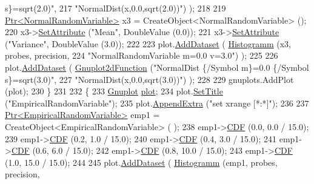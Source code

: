 \begin{DoxyCode}
{       s\}=sqrt(2.0)"},
217                                          \textcolor{stringliteral}{"NormalDist(x,0.0,sqrt(2.0))"}) );
218 
219     \hyperlink{classns3_1_1Ptr}{Ptr<NormalRandomVariable>} x3 = CreateObject<NormalRandomVariable> ();
220     x3->\hyperlink{classns3_1_1ObjectBase_ac60245d3ea4123bbc9b1d391f1f6592f}{SetAttribute} (\textcolor{stringliteral}{"Mean"}, DoubleValue (0.0));
221     x3->\hyperlink{classns3_1_1ObjectBase_ac60245d3ea4123bbc9b1d391f1f6592f}{SetAttribute} (\textcolor{stringliteral}{"Variance"}, DoubleValue (3.0));
222 
223     plot.\hyperlink{classns3_1_1Gnuplot_a306ec724a327cf9ab699700f31fca0a1}{AddDataset} ( \hyperlink{main-random-variable_8cc_a2cfd3837ab3f2e816cf53486d7a186b5}{Histogramm} (x3, probes, precision,
224                                   \textcolor{stringliteral}{"NormalRandomVariable m=0.0 v=3.0"}) );
225 
226     plot.\hyperlink{classns3_1_1Gnuplot_a306ec724a327cf9ab699700f31fca0a1}{AddDataset} ( \hyperlink{classns3_1_1Gnuplot2dFunction}{Gnuplot2dFunction} (\textcolor{stringliteral}{"NormalDist \{/Symbol m\}=0.0 \{/Symbol
       s\}=sqrt(3.0)"},
227                                          \textcolor{stringliteral}{"NormalDist(x,0.0,sqrt(3.0))"}) );
228 
229     gnuplots.AddPlot (plot);
230   \}
231 
232   \{
233     \hyperlink{classns3_1_1Gnuplot}{Gnuplot} \hyperlink{lte__amc_8m_a5942306abe9f005572e4344e3cdef528}{plot};
234     plot.\hyperlink{classns3_1_1Gnuplot_ac01f15633d49f0239f8a45293a1e04f0}{SetTitle} (\textcolor{stringliteral}{"EmpiricalRandomVariable"});
235     plot.\hyperlink{classns3_1_1Gnuplot_a649a3041b9d0ea21a212b5ad9b28ecbf}{AppendExtra} (\textcolor{stringliteral}{"set xrange [*:*]"});
236 
237     \hyperlink{classns3_1_1Ptr}{Ptr<EmpiricalRandomVariable>} emp1 = CreateObject<EmpiricalRandomVariable> (
      );
238     emp1->\hyperlink{classns3_1_1EmpiricalRandomVariable_a1f85096a98576ebe48417698f191805d}{CDF} (0.0,  0.0 / 15.0);
239     emp1->\hyperlink{classns3_1_1EmpiricalRandomVariable_a1f85096a98576ebe48417698f191805d}{CDF} (0.2,  1.0 / 15.0);
240     emp1->\hyperlink{classns3_1_1EmpiricalRandomVariable_a1f85096a98576ebe48417698f191805d}{CDF} (0.4,  3.0 / 15.0);
241     emp1->\hyperlink{classns3_1_1EmpiricalRandomVariable_a1f85096a98576ebe48417698f191805d}{CDF} (0.6,  6.0 / 15.0);
242     emp1->\hyperlink{classns3_1_1EmpiricalRandomVariable_a1f85096a98576ebe48417698f191805d}{CDF} (0.8, 10.0 / 15.0);
243     emp1->\hyperlink{classns3_1_1EmpiricalRandomVariable_a1f85096a98576ebe48417698f191805d}{CDF} (1.0, 15.0 / 15.0);
244 
245     plot.\hyperlink{classns3_1_1Gnuplot_a306ec724a327cf9ab699700f31fca0a1}{AddDataset} ( \hyperlink{main-random-variable_8cc_a2cfd3837ab3f2e816cf53486d7a186b5}{Histogramm} (emp1, probes, precision,

\end{DoxyCode}
